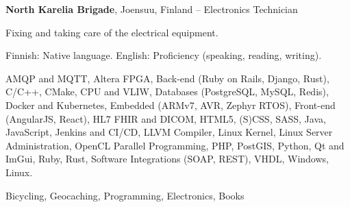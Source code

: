 \documentclass[letterpaper,MMMyyyy,nonstopmode]{simpleresumecv}
\begin{document}
\begin{Body}
\BigGap
\Entry
\textbf{North Karelia Brigade}, Joensuu, Finland
\hfill
{} -- 
\Gap
\BulletItem Electronics Technician
\begin{Detail}
    \SubBulletItem Fixing and taking care of the electrical equipment.
\end{Detail}



\BulletItem Finnish: Native language.
\Gap
\BulletItem English: Proficiency (speaking, reading, writing).



\Entry
\BulletItem AMQP and MQTT,
\BulletItem Altera FPGA,
\BulletItem Back-end (Ruby on Rails, Django, Rust),
\BulletItem C/C++,
\BulletItem CMake,
\BulletItem CPU and VLIW,
\BulletItem Databases (PostgreSQL, MySQL, Redis),
\BulletItem Docker and Kubernetes,
\BulletItem Embedded (ARMv7, AVR, Zephyr RTOS),
\BulletItem Front-end (AngularJS, React),
\BulletItem HL7 FHIR and DICOM,
\BulletItem HTML5, (S)CSS, SASS,
\BulletItem Java,
\BulletItem JavaScript,
\BulletItem Jenkins and CI/CD,
\BulletItem LLVM Compiler,
\BulletItem Linux Kernel,
\BulletItem Linux Server Administration,
\BulletItem OpenCL Parallel Programming,
\BulletItem PHP,
\BulletItem PostGIS,
\BulletItem Python,
\BulletItem Qt and ImGui,
\BulletItem Ruby,
\BulletItem Rust,
\BulletItem Software Integrations (SOAP, REST),
\BulletItem VHDL,
\BulletItem Windows, Linux.



\Entry
Bicycling, Geocaching, Programming, Electronics, Books

\end{Body}
\end{document}

